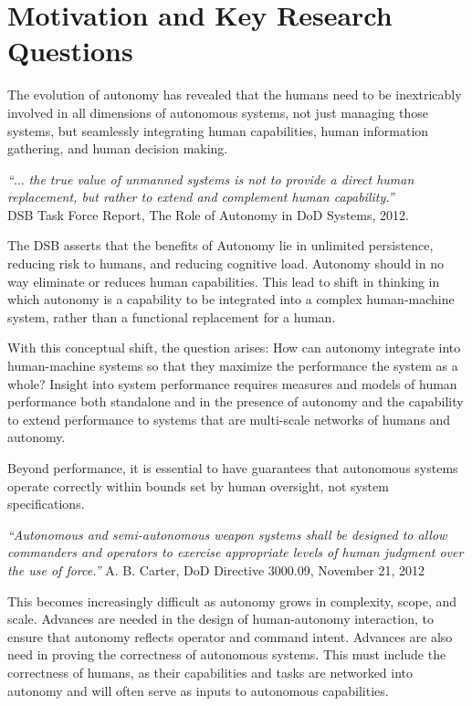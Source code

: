 
\section*{Motivation and Key Research Questions}

The evolution of autonomy has revealed that the humans need to be inextricably involved in all dimensions of autonomous systems, not 
just managing those systems, but seamlessly integrating human capabilities, human information gathering, and human decision making.
\begin{center}
\parbox[c]{6in}{
{\em ``$\ldots$ the true value of unmanned systems is not to provide a direct human replacement, but rather to extend and complement human capability.''} \\
\hspace*{20pt} DSB Task Force Report, The Role of Autonomy in DoD Systems, 2012.
}
\end{center}
The DSB asserts that the benefits of Autonomy lie in unlimited persistence, reducing risk to humans, and reducing cognitive load.
Autonomy should in no way eliminate or reduces human capabilities.  This lead to shift in thinking in which autonomy is a capability to
be integrated into a complex human-machine system,  rather than a functional replacement for a human.

With this conceptual shift, the question arises: How can autonomy integrate into human-machine systems so that they maximize the 
performance the system as a whole?  Insight into system performance requires measures and models of human performance 
both standalone and in the presence of autonomy and the capability to extend performance to systems that are multi-scale
networks of humans and autonomy.

Beyond performance, it is essential to have
guarantees that autonomous systems operate correctly within bounds set by human oversight, not system specifications.
\begin{center}
\parbox[c]{6in}{
{\em ``Autonomous and semi-autonomous weapon systems shall be designed to allow 
commanders and operators to exercise appropriate levels of human judgment over the use of force.''}
\hspace*{20pt} A. B. Carter, DoD Directive 3000.09, November 21, 2012
}
\end{center}
This becomes increasingly difficult as autonomy grows in complexity, scope, and scale.  Advances are needed in 
the design of human-autonomy interaction, to ensure that autonomy reflects operator and command intent.  
Advances are also need in proving the correctness of autonomous systems.  This must include the correctness of
humans, as their capabilities and tasks are networked into autonomy and will often serve as inputs to 
autonomous capabilities.

